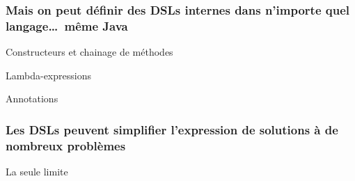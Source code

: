 \begin{frame}
\frametitle{Mais on peut d\'efinir des DSLs internes dans n'importe quel langage\ldots\ m\^eme Java}


\begin{block}{Constructeurs et chainage de m\'ethodes}
\end{block}

\VF

\begin{block}{Lambda-expressions}
\end{block}

\VF

\begin{block}{Annotations}
\end{block}

\VF

\NOTE{\ }

\end{frame}


\begin{frame}
\frametitle{Les DSLs peuvent simplifier l'expression de solutions \`a
de nombreux probl\`emes}



\begin{block}{La seule limite}


\end{block}

\NOTE{\ }

\end{frame}







